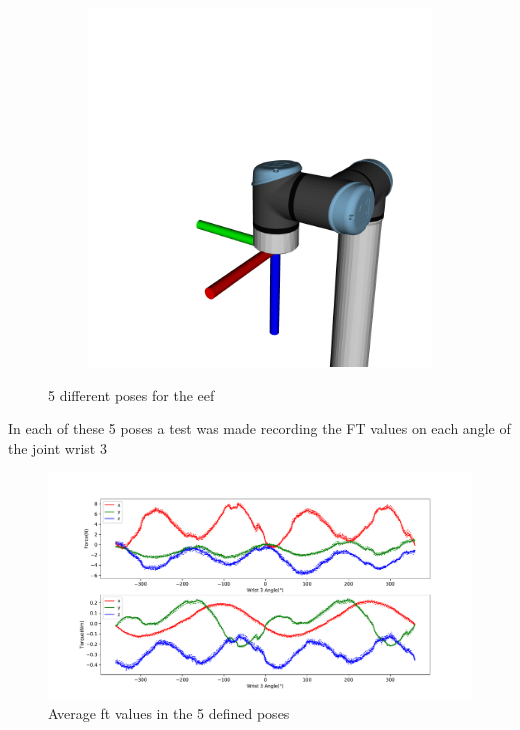 \begin{figure}[h]
\begin{subfigure}{.195\linewidth}
        \label{fig:eef_p4}
    \end{subfigure}
    \begin{subfigure}{.195\linewidth}
        \centering
        \includegraphics[width=\linewidth]{figs/chp3/P5.png}
        \label{fig:eef_p5}
    \end{subfigure}
    \caption{5 different poses for the \ac{eef}}
    \label{fig:eef_5_position}
\end{figure}

\par In each of these 5 poses a test was made recording the FT values on each angle of the joint wrist 3

\begin{figure}[h]
    \centering
    \includegraphics[width=\linewidth]{figs/chp3/ft_sensor_test_5.pdf}
    \caption{Average \ac{ft} values in the 5 defined poses}
    \label{fig:ft_sensor_test_5}
\end{figure}


